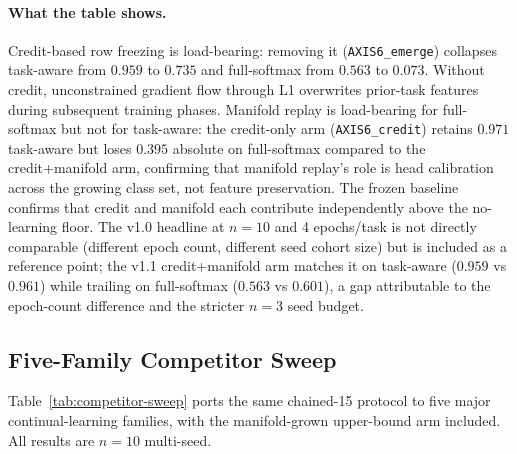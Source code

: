 \documentclass[11pt]{article}
\newcommand{\arm}[1]{\texttt{#1}}
\begin{document}
\paragraph{What the table shows.}
Credit-based row freezing is load-bearing: removing it
(\arm{AXIS6\_emerge}) collapses task-aware from $0.959$ to
$0.735$ and full-softmax from $0.563$ to $0.073$. Without
credit, unconstrained gradient flow through L1 overwrites
prior-task features during subsequent training phases.
Manifold replay is load-bearing for full-softmax but not for
task-aware: the credit-only arm (\arm{AXIS6\_credit}) retains
$0.971$ task-aware but loses $0.395$ absolute on full-softmax
compared to the credit+manifold arm, confirming that manifold
replay's role is head calibration across the growing class set,
not feature preservation. The frozen baseline confirms that
credit and manifold each contribute independently above the
no-learning floor. The v1.0 headline at $n = 10$ and 4
epochs/task is not directly comparable (different epoch count,
different seed cohort size) but is included as a reference point;
the v1.1 credit+manifold arm matches it on task-aware ($0.959$
vs $0.961$) while trailing on full-softmax ($0.563$ vs $0.601$),
a gap attributable to the epoch-count difference and the stricter
$n = 3$ seed budget.

\subsection{Five-Family Competitor Sweep}
\label{sec:competitor-sweep}

Table~\ref{tab:competitor-sweep} ports the same chained-15 protocol to
five major continual-learning families, with the manifold-grown
upper-bound arm included. All results are $n = 10$ multi-seed.
\end{document}
